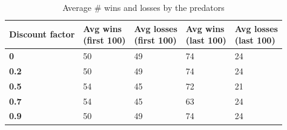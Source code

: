 \begin{table}[H]
\begin{center}
\begin{tabular}{| l | l | l | l | l |}
\hline
\parbox{2cm}{\textbf{Discount factor}} & \parbox{2cm}{\textbf{Avg wins \\ (first 100)}} & \parbox{2cm}{\textbf{Avg losses \\ (first 100)}} & \parbox{2cm}{\textbf{Avg wins \\ (last 100)}} & \parbox{2cm}{\textbf{Avg losses \\ (last 100)}} \\
\hline
\textbf{0} & 50 & 49 & 74 & 24 \\
\hline
\textbf{0.2} & 50 & 49 & 74 & 24 \\
\hline
\textbf{0.5} & 54 & 45 & 72 & 21 \\
\hline
\textbf{0.7} & 54 & 45 & 63 & 24 \\
\hline
\textbf{0.9} & 50 & 49 & 74 & 24 \\
\hline
\end{tabular}
\caption{Average \# wins and losses by the predators}
\end{center}
\end{table}
